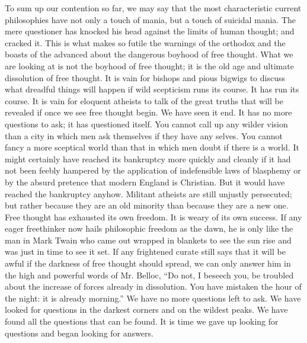 To sum up our contention so far, we may say that the most characteristic current philosophies have not only a touch of mania, but a touch of suicidal mania. The mere questioner has knocked his head against the limits of human thought; and cracked it. This is what makes so futile the warnings of the orthodox and the boasts of the advanced about the dangerous boyhood of free thought. What we are looking at is not the boyhood of free thought; it is the old age and ultimate dissolution of free thought. It is vain for bishops and pious bigwigs to discuss what dreadful things will happen if wild scepticism runs its course. It has run its course. It is vain for eloquent atheists to talk of the great truths that will be revealed if once we see free thought begin. We have seen it end. It has no more questions to ask; it has questioned itself. You cannot call up any wilder vision than a city in which men ask themselves if they have any selves. You cannot fancy a more sceptical world than that in which men doubt if there is a world. It might certainly have reached its bankruptcy more quickly and cleanly if it had not been feebly hampered by the application of indefensible laws of blasphemy or by the absurd pretence that modern England is Christian. But it would have reached the bankruptcy anyhow. Militant atheists are still unjustly persecuted; but rather because they are an old minority than because they are a new one. Free thought has exhausted its own freedom. It is weary of its own success. If any eager freethinker now hails philosophic freedom as the dawn, he is only like the man in Mark Twain who came out wrapped in blankets to see the sun rise and was just in time to see it set. If any frightened curate still says that it will be awful if the darkness of free thought should spread, we can only answer him in the high and powerful words of Mr. Belloc, “Do not, I beseech you, be troubled about the increase of forces already in dissolution. You have mistaken the hour of the night: it is already morning.” We have no more questions left to ask. We have looked for questions in the darkest corners and on the wildest peaks. We have found all the questions that can be found. It is time we gave up looking for questions and began looking for answers.

